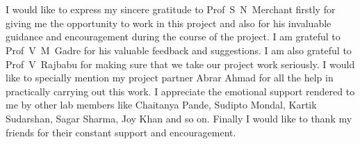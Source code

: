\chapter*{}
I would like to express my sincere gratitude to Prof~S~N~Merchant firstly for
giving me the opportunity to work in this project and also for his
invaluable guidance and encouragement during the course of the project. I am
grateful to Prof~V~M~Gadre for his valuable feedback and suggestions. I am
also grateful to Prof~V~Rajbabu for making sure that we take our project work
seriously. I would like to specially mention my project partner Abrar Ahmad 
for all the help in practically carrying out this work. I appreciate the 
emotional support rendered to me by other lab members like Chaitanya Pande, 
Sudipto Mondal, Kartik Sudarshan, Sagar Sharma, Joy Khan and so on. Finally
I would like to thank my friends for their constant support and encouragement.
